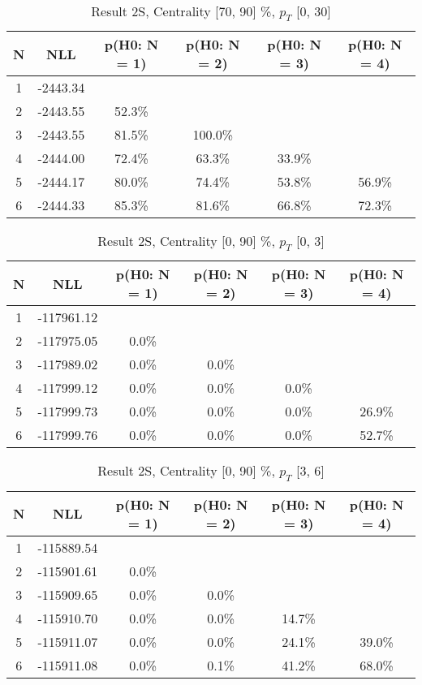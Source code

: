 \begin{table}[htb]
	\begin{center}
	\caption{Result 2S, Centrality [70, 90] \%, $p_{T}$ [0, 30] \GeV
}
{\footnotesize\renewcommand{\arraystretch}{1.4}
		\begin{tabular}{cc||cccc}
			N & NLL & p(H0: N = 1) & p(H0: N = 2) & p(H0: N = 3) & p(H0: N = 4)\\ 
		\hline
1 & -2443.34 & & & & \\
2 & -2443.55 & 52.3\% & & & \\
3 & -2443.55 & 81.5\% & 100.0\% & & \\
4 & -2444.00 & 72.4\% & 63.3\% & 33.9\% & \\
5 & -2444.17 & 80.0\% & 74.4\% & 53.8\% & 56.9\% \\
6 & -2444.33 & 85.3\% & 81.6\% & 66.8\% & 72.3\% \\
	\end{tabular}
		\label{tab:lab}
	}
	\end{center}\end{table}

\begin{table}[htb]
	\begin{center}
	\caption{Result 2S, Centrality [0, 90] \%, $p_{T}$ [0, 3] \GeV
}
{\footnotesize\renewcommand{\arraystretch}{1.4}
		\begin{tabular}{cc||cccc}
			N & NLL & p(H0: N = 1) & p(H0: N = 2) & p(H0: N = 3) & p(H0: N = 4)\\ 
		\hline
1 & -117961.12 & & & & \\
2 & -117975.05 & 0.0\% & & & \\
3 & -117989.02 & 0.0\% & 0.0\% & & \\
4 & -117999.12 & 0.0\% & 0.0\% & 0.0\% & \\
5 & -117999.73 & 0.0\% & 0.0\% & 0.0\% & 26.9\% \\
6 & -117999.76 & 0.0\% & 0.0\% & 0.0\% & 52.7\% \\
	\end{tabular}
		\label{tab:lab}
	}
	\end{center}\end{table}

\begin{table}[htb]
	\begin{center}
	\caption{Result 2S, Centrality [0, 90] \%, $p_{T}$ [3, 6] \GeV
}
{\footnotesize\renewcommand{\arraystretch}{1.4}
		\begin{tabular}{cc||cccc}
			N & NLL & p(H0: N = 1) & p(H0: N = 2) & p(H0: N = 3) & p(H0: N = 4)\\ 
		\hline
1 & -115889.54 & & & & \\
2 & -115901.61 & 0.0\% & & & \\
3 & -115909.65 & 0.0\% & 0.0\% & & \\
4 & -115910.70 & 0.0\% & 0.0\% & 14.7\% & \\
5 & -115911.07 & 0.0\% & 0.0\% & 24.1\% & 39.0\% \\
6 & -115911.08 & 0.0\% & 0.1\% & 41.2\% & 68.0\% \\
	\end{tabular}
		\label{tab:lab}
	}
	\end{center}\end{table}


